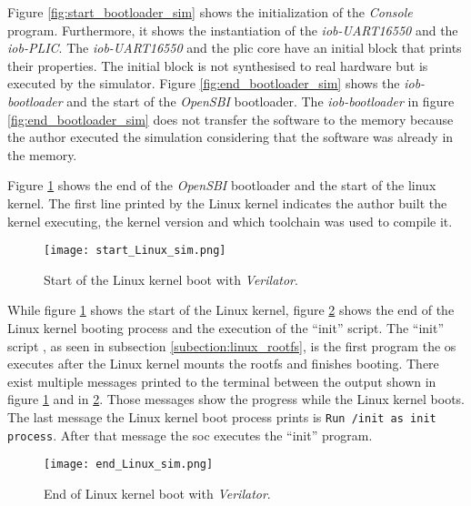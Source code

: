 Figure \ref{fig:start_bootloader_sim} shows the initialization of the \textit{Console} program. Furthermore, it shows the instantiation of the \textit{iob-UART16550} and the \textit{iob-PLIC}. The \textit{iob-UART16550} and the \acrshort{plic} core have an initial block that prints their properties. The initial block is not synthesised to real hardware but is executed by the simulator. Figure \ref{fig:end_bootloader_sim} shows the \textit{iob-bootloader} and the start of the \textit{OpenSBI} bootloader. The \textit{iob-bootloader} in figure \ref{fig:end_bootloader_sim} does not transfer the software to the memory because the author executed the simulation considering that the software was already in the memory.

Figure \ref{fig:start_linux_sim} shows the end of the \textit{OpenSBI} bootloader and the start of the linux kernel. The first line printed by the Linux kernel indicates the author built the kernel executing, the kernel version and which toolchain was used to compile it.

\begin{figure}[!ht]
    \centering
    \centering
    \texttt{[image: start\_Linux\_sim.png]}
    \caption{Start of the Linux kernel boot with \textit{Verilator}.}
    \label{fig:start_linux_sim}
\end{figure}

While figure \ref{fig:start_linux_sim} shows the start of the Linux kernel, figure \ref{fig:end_linux_verilator} shows the end of the Linux kernel booting process and the execution of the \enquote{init} script. The \enquote{init} script , as seen in subsection \ref{subection:linux_rootfs}, is the first program the \acrshort{os} executes after the Linux kernel mounts the \acrshort{rootfs} and finishes booting. There exist multiple messages printed to the terminal between the output shown in figure \ref{fig:start_linux_sim} and in \ref{fig:end_linux_verilator}. Those messages show the progress while the Linux kernel boots. The last message the Linux kernel boot process prints is \lstinline{Run /init as init process}. After that message the \acrshort{soc} executes the \enquote{init} program.

\begin{figure}[!ht]
    \centering
    \texttt{[image: end\_Linux\_sim.png]}
    \caption{End of Linux kernel boot with \textit{Verilator}.}
    \label{fig:end_linux_verilator}
\end{figure}

